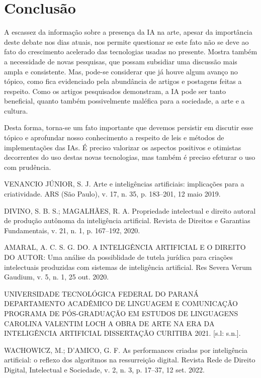 \documentclass[12pt]{article}
\begin{document}
	\section{Conclusão}
	\label{sec:metodologia}
	
	A escassez da informação sobre a presença da IA na arte, apesar da importância deste debate nos dias atuais, nos permite questionar se este fato não se deve ao fato do crescimento acelerado das tecnologias usadas no presente. Mostra também a necessidade de novas pesquisas, que possam subsidiar uma discussão mais ampla e consistente. Mas, pode-se considerar que já houve algum avanço no tópico, como fica evidenciado pela abundância de artigos e postagens feitas a respeito. Como os artigos pesquisados demonstram, a IA pode ser tanto beneficial, quanto também possivelmente maléfica para a sociedade, a arte e a cultura.

    Desta forma, torna-se um fato importante que devemos persistir em discutir esse tópico e aprofundar nosso conhecimento a respeito de leis e métodos de implementações das IAs. É preciso valorizar os aspectos positivos e otimistas decorrentes do uso destas novas tecnologias, mas também é preciso efeturar o uso com prudência.
	
    
    

    VENANCIO JÚNIOR, S. J. Arte e inteligências artificiais: implicações para a criatividade. ARS (São Paulo), v. 17, n. 35, p. 183–201, 12 maio 2019.

    DIVINO, S. B. S.; MAGALHÃES, R. A. Propriedade intelectual e direito autoral de produção autônoma da inteligência artificial. Revista de Direitos e Garantias Fundamentais, v. 21, n. 1, p. 167–192, 2020.

    AMARAL, A. C. S. G. DO. A INTELIGÊNCIA ARTIFICIAL E O DIREITO DO AUTOR: Uma análise da possiblidade de tutela jurídica para criações intelectuais produzidas com sistemas de inteligência artificial. Res Severa Verum Gaudium, v. 5, n. 1, 25 out. 2020.

    UNIVERSIDADE TECNOLÓGICA FEDERAL DO PARANÁ DEPARTAMENTO ACADÊMICO DE LINGUAGEM E COMUNICAÇÃO PROGRAMA DE PÓS-GRADUAÇÃO EM ESTUDOS DE LINGUAGENS CAROLINA VALENTIM LOCH A OBRA DE ARTE NA ERA DA INTELIGÊNCIA ARTIFICIAL DISSERTAÇÃO CURITIBA 2021. [s.l: s.n.].

    WACHOWICZ, M.; D’AMICO, G. F. As performances criadas por inteligência artificial: o reflexo dos algoritmos na ressurreição digital. Revista Rede de Direito Digital, Intelectual e Sociedade, v. 2, n. 3, p. 17–37, 12 set. 2022.
\end{document}
